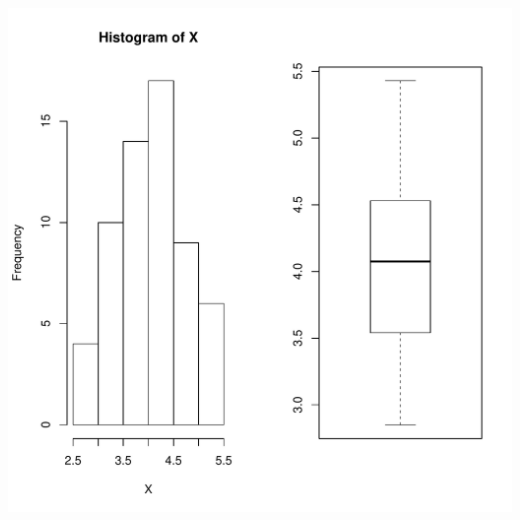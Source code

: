 \documentclass[12pt,letterpaper]{article}\usepackage[]{graphicx}\usepackage[]{color}
\makeatletter
\def\maxwidth{ %
  \ifdim\Gin@nat@width>\linewidth
    \linewidth
  \else
    \Gin@nat@width
  \fi
}
\newenvironment{knitrout}{}{} %
\makeatother
\begin{document}
\begin{knitrout}
\includegraphics[width=\maxwidth]{figure/unnamed-chunk-12-3} 

\end{knitrout}
\end{document}
